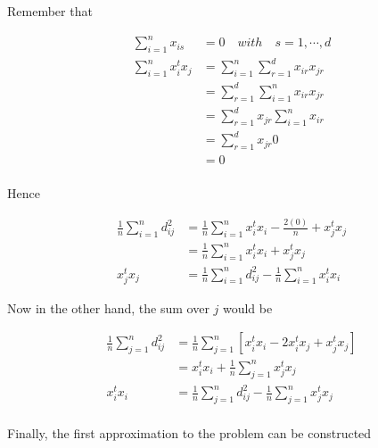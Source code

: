 \documentclass[12pt,journal]{IEEEtran}
\begin{document}
    Remember that

    \begin{equation*}
        \begin{aligned}
              \sum_{i=1}^n x_{is} &= 0 \quad with \quad s = 1, \cdots, d\\
            \sum_{i=1}^n x_i^t x_j &= \sum_{i=1}^n \sum_{r=1}^d x_{ir} x_{jr}\\
                                   &= \sum_{r=1}^d \sum_{i=1}^n x_{ir} x_{jr}\\
                                   &= \sum_{r=1}^d x_{jr} \sum_{i=1}^n x_{ir}\\
                                   &= \sum_{r=1}^d x_{jr} 0\\
                                   &= 0\\
        \end{aligned}
    \end{equation*}

    Hence

    \begin{equation*}
        \begin{aligned}
            \frac{1}{n} \sum_{i=1}^n d_{ij}^2
            &= 
            \frac{1}{n} \sum_{i=1}^n x_i^t x_i - \frac{2(0)}{n} + x_j^t x_j\\
            &= 
            \frac{1}{n} \sum_{i=1}^n x_i^t x_i + x_j^t x_j\\
            x_j^t x_j &= \frac{1}{n} \sum_{i=1}^n d_{ij}^2 - \frac{1}{n} \sum_{i=1}^n x_i^t x_i
        \end{aligned}
    \end{equation*}

    Now in the other hand, the sum over $j$ would be

    \begin{equation*}
        \begin{aligned}
            \frac{1}{n} \sum_{j=1}^n d_{ij}^2
            &=
            \frac{1}{n} \sum_{j=1}^n [x_i^t x_i - 2 x_i^t x_j + x_j^t x_j]\\
            &= 
            x_i^t x_i + \frac{1}{n} \sum_{j=1}^n x_j^t x_j\\
            x_i^t x_i &= \frac{1}{n} \sum_{j=1}^n d_{ij}^2 - \frac{1}{n} \sum_{j=1}^n x_j^t x_j\\
        \end{aligned}
    \end{equation*}

    Finally, the first approximation to the problem can be constructed
\end{document}
